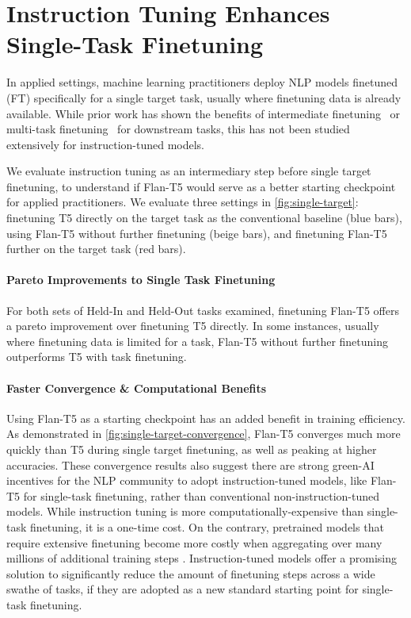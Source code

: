 \section{Instruction Tuning Enhances Single-Task Finetuning}
\label{sec:single-target-ft}

In applied settings, machine learning practitioners deploy NLP models finetuned (FT) specifically for a single target task, usually where finetuning data is already available. While prior work has shown the benefits of intermediate finetuning~\citep{pruksachatkun2020intermediate,vu-etal-2020-exploring} or multi-task finetuning~\citep{aghajanyan-etal-2021-muppet,aribandi2021ext5} %
for downstream tasks, this has not been studied extensively for instruction-tuned models.

We evaluate \flantwo{} instruction tuning as an intermediary step before single target finetuning, to understand if Flan-T5 would serve as a better starting checkpoint for applied practitioners.
We evaluate three settings in \cref{fig:single-target}: finetuning T5 directly on the target task as the conventional baseline (blue bars), using Flan-T5 without further finetuning (beige bars), and finetuning Flan-T5 further on the target task (red bars).

\vspace{-3mm}
\paragraph{Pareto Improvements to Single Task Finetuning}
For both sets of Held-In and Held-Out tasks examined, finetuning Flan-T5 offers a pareto improvement over finetuning T5 directly. In some instances, usually where finetuning data is limited for a task, Flan-T5 without further finetuning outperforms T5 with task finetuning.

\vspace{-3mm}
\paragraph{Faster Convergence \& Computational Benefits}
Using Flan-T5 as a starting checkpoint has an added benefit in training efficiency.
As demonstrated in \cref{fig:single-target-convergence}, Flan-T5 converges much more quickly than T5 during single target finetuning, as well as peaking at higher accuracies.
These convergence results also suggest there are strong green-AI incentives for the NLP community to adopt instruction-tuned models, like Flan-T5 for single-task finetuning, rather than conventional non-instruction-tuned models.
While instruction tuning is more computationally-expensive than single-task finetuning, it is a one-time cost.
On the contrary, pretrained models that require extensive finetuning become more costly when aggregating over many millions of additional training steps \citep{wu2022sustainable, bommasani2021opportunities}. Instruction-tuned models offer a promising solution to significantly reduce the amount of finetuning steps across a wide swathe of tasks, if they are adopted as a new standard starting point for single-task finetuning.

